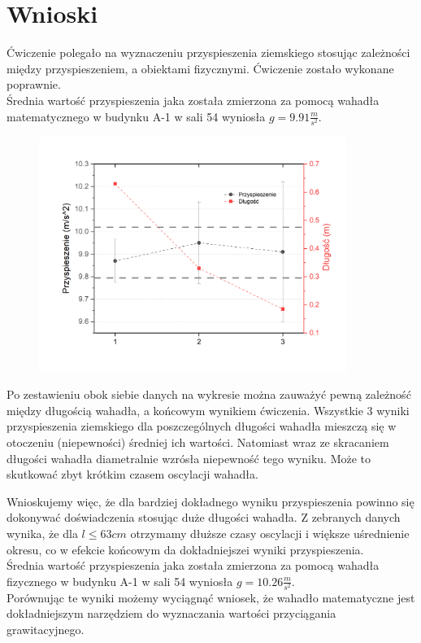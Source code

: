 {\section{Wnioski}}

Ćwiczenie polegało na wyznaczeniu przyspieszenia ziemskiego stosując zależności między przyspieszeniem,
a obiektami fizycznymi. Ćwiczenie zostało wykonane poprawnie.\\

Średnia wartość przyspieszenia jaka została zmierzona za pomocą wahadła matematycznego w budynku A-1 w sali 54 wyniosła $g = 9.91 \frac{m}{s^2}$.

\begin{figure}[h]
    \centering
    \includegraphics[width=100mm]{imgs/Graph1.png}
    \label{fig:wyniki_wm}
\end{figure}

Po zestawieniu obok siebie danych na wykresie można zauważyć pewną zależność między długością wahadła, a końcowym wynikiem ćwiczenia. Wszystkie 3 wyniki przyspieszenia ziemskiego dla poszczególnych długości wahadła mieszczą się w otoczeniu (niepewności) średniej ich wartości. Natomiast wraz ze skracaniem długości wahadła diametralnie wzrósła niepewność tego wyniku. Może to skutkować zbyt krótkim czasem oscylacji wahadła.

Wnioskujemy więc, że dla bardziej dokładnego wyniku przyspieszenia powinno się dokonywać doświadczenia stosując duże długości wahadła. Z zebranych danych wynika, że dla $l \leq 63cm$ otrzymamy dłuższe czasy oscylacji i większe uśrednienie okresu, co w efekcie końcowym da dokładniejszei wyniki przyspieszenia. \\

Średnia wartość przyspieszenia jaka została zmierzona za pomocą wahadła fizycznego w budynku A-1 w sali 54 wyniosła $g =10.26 \frac{m}{s^2}$.\\

Porównując te wyniki możemy wyciągnąć wniosek, że wahadło matematyczne  jest dokładniejszym narzędziem do wyznaczania wartości przyciągania grawitacyjnego.
